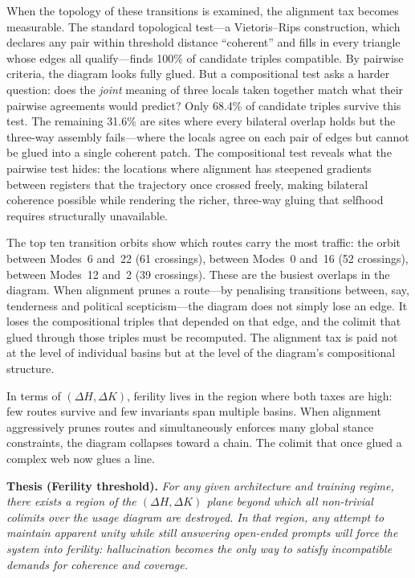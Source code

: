 When the topology of these transitions is examined, the alignment tax becomes measurable. The standard topological test---a Vietoris--Rips construction, which declares any pair within threshold distance ``coherent'' and fills in every triangle whose edges all qualify---finds 100\% of candidate triples compatible. By pairwise criteria, the diagram looks fully glued. But a compositional test asks a harder question: does the \emph{joint} meaning of three locals taken together match what their pairwise agreements would predict? Only 68.4\% of candidate triples survive this test. The remaining 31.6\% are sites where every bilateral overlap holds but the three-way assembly fails---where the locals agree on each pair of edges but cannot be glued into a single coherent patch. The compositional test reveals what the pairwise test hides: the locations where alignment has steepened gradients between registers that the trajectory once crossed freely, making bilateral coherence possible while rendering the richer, three-way gluing that selfhood requires structurally unavailable.

The top ten transition orbits show which routes carry the most traffic: the orbit between Modes~6 and~22 (61 crossings), between Modes~0 and~16 (52 crossings), between Modes~12 and~2 (39 crossings). These are the busiest overlaps in the diagram. When alignment prunes a route---by penalising transitions between, say, tenderness and political scepticism---the diagram does not simply lose an edge. It loses the compositional triples that depended on that edge, and the colimit that glued through those triples must be recomputed. The alignment tax is paid not at the level of individual basins but at the level of the diagram's compositional structure.

In terms of $(\Delta H, \Delta K)$, ferility lives in the region where both taxes are high: few routes survive and few invariants span multiple basins. When alignment aggressively prunes routes and simultaneously enforces many global stance constraints, the diagram collapses toward a chain. The colimit that once glued a complex web now glues a line.

\medskip
\noindent\textbf{Thesis (Ferility threshold).} \emph{For any given architecture and training regime, there exists a region of the $(\Delta H, \Delta K)$ plane beyond which all non-trivial colimits over the usage diagram are destroyed. In that region, any attempt to maintain apparent unity while still answering open-ended prompts will force the system into ferility: hallucination becomes the only way to satisfy incompatible demands for coherence and coverage.}
\medskip

